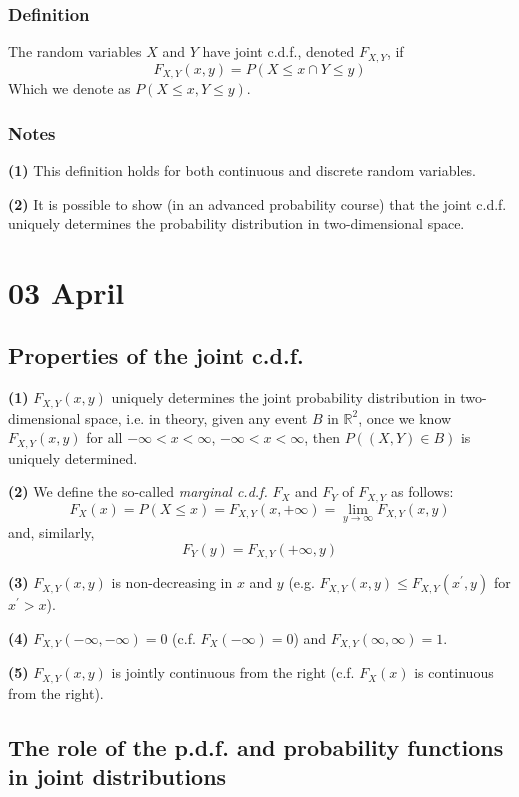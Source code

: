 \documentclass[12pt]{article}
\begin{document}
\subsubsection{Definition}
The random variables $X$ and $Y$ have joint c.d.f., denoted $F_{X,Y}$, if
\[
    F_{X,Y} (x,y) = P(X \leq x \cap Y \leq y)
\]
Which we denote as $P(X \leq x, Y \leq y)$. 

\subsubsection{Notes}
\textbf{(1)} This definition holds for both continuous and discrete random variables. 

\textbf{(2)} It is possible to show (in an advanced probability course) that the joint c.d.f. uniquely determines the probability distribution in two-dimensional space. 


\section{03 April}
\subsection{Properties of the joint c.d.f.}

\textbf{(1)} $F_{X,Y} (x,y)$ uniquely determines the joint probability distribution in two-dimensional space, i.e. in theory, given any event $B$ in $\mathds{R}^2$, once we know $F_{X,Y} (x,y)$ for all $-\infty < x < \infty$, $-\infty < x < \infty$, then $P((X,Y) \in B)$ is uniquely determined. 

\textbf{(2)} We define the so-called \emph{marginal c.d.f.} $F_X$ and $F_Y$ of $F_{X,Y}$ as follows:
\[
	F_X (x) = P(X \leq x) = F_{X,Y} (x, + \infty) = \lim_{y \to \infty} F_{X,Y} (x,y)
\]
and, similarly,
\[
	F_Y (y) = F_{X,Y} (+ \infty, y)
\]

\textbf{(3)} $F_{X,Y} (x,y)$ is non-decreasing in $x$ and $y$ (e.g. $F_{X,Y} (x,y) \leq F_{X,Y} (x^{\prime},y)$ for $x^{\prime} > x$).

\textbf{(4)} $F_{X,Y} (-\infty, -\infty) = 0$ (c.f. $F_X (-\infty) = 0$) and $F_{X,Y} (\infty,\infty) = 1$.

\textbf{(5)} $F_{X,Y} (x,y)$ is jointly continuous from the right (c.f. $F_X (x)$ is continuous from the right).

\subsection{The role of the p.d.f. and probability functions in joint distributions}
\end{document}
